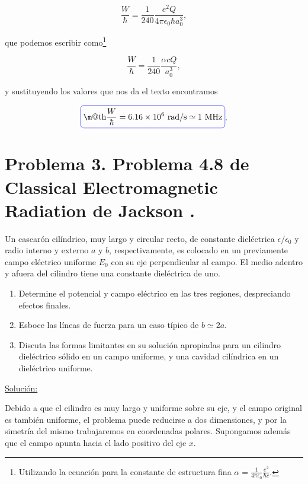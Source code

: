 \documentclass[a4paper,11pt]{article}
\makeatletter
\numberwithin{equation}{section}
\newcommand*{\boxcolor}{blue}
\renewcommand{\boxed}[1]{\textcolor{\boxcolor}{%
\tikz[baseline={([yshift=-1ex]current bounding box.center)}] \node [rectangle, minimum width=1ex,rounded corners,draw] {\normalcolor\m@th$\displaystyle#1$};}}
\makeatother
\begin{document}
\begin{equation}
 \frac{W}{\hbar} = \frac{1}{240}\frac{e^2Q}{4\pi\epsilon_0\hbar a_0^3},
\end{equation}

que podemos escribir como\footnote{Utilizando la ecuación para la constante 
de estructura fina $\alpha = \frac{1}{4\pi\epsilon_0}\frac{e^2}{\hbar c}$.}

\begin{equation}
 \frac{W}{\hbar} = \frac{1}{240}\frac{\alpha c Q}{a_0^3},
\end{equation}

y sustituyendo los valores que nos da el texto encontramos 

\begin{equation}
 \boxed{\frac{W}{\hbar} = 6.16 \times 10^6 \text{ rad/s} \simeq 1 \text{ MHz}}.
\end{equation}

\newpage

\section{Problema 3. Problema 4.8 de Classical Electromagnetic Radiation
de Jackson \cite{jackson}.}

Un cascarón cilíndrico, muy largo y circular recto, de constante dieléctrica 
$\epsilon/\epsilon_0$ y radio interno y externo $a$ y $b$, respectivamente, 
es colocado en un previamente campo eléctrico uniforme $E_0$ con su eje perpendicular 
al campo. El medio adentro y afuera del cilindro tiene una constante dieléctrica de 
uno.

\begin{enumerate}[label=\textbf{(\alph*)}]
\item Determine el potencial y campo eléctrico en las tres regiones, despreciando 
efectos finales.
\item Esboce las líneas de fuerza para un caso típico de $b \simeq 2a$.
\item Discuta las formas limitantes en su solución apropiadas para un cilindro 
dieléctrico sólido en un campo uniforme, y una cavidad cilíndrica en un dieléctrico 
uniforme.
\end{enumerate}

\vspace{.3cm}

\underline{Solución:} \vspace{.3cm}

Debido a que el cilindro es muy largo y uniforme sobre su eje, y el campo original 
es también uniforme, el problema puede reducirse a dos dimensiones, y por la simetría 
del mismo trabajaremos en coordenadas polares. Supongamos además que el campo apunta 
hacia el lado positivo del eje $x$. 
\end{document}
